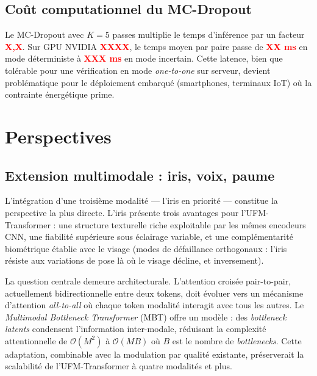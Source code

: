 \documentclass[12pt,a4paper]{report}
\begin{document}
\subsection{Co\^{u}t computationnel du MC-Dropout}

Le MC-Dropout avec $K=5$ passes multiplie le temps d'inf\'{e}rence par un facteur \textcolor{red}{\textbf{X,X}}. Sur GPU NVIDIA \textcolor{red}{\textbf{XXXX}}, le temps moyen par paire passe de \textcolor{red}{\textbf{XX ms}} en mode d\'{e}terministe \`{a} \textcolor{red}{\textbf{XXX ms}} en mode incertain. Cette latence, bien que tol\'{e}rable pour une v\'{e}rification en mode \emph{one-to-one} sur serveur, devient probl\'{e}matique pour le d\'{e}ploiement embarqu\'{e} (smartphones, terminaux IoT) o\`{u} la contrainte \'{e}nerg\'{e}tique prime.

\section{Perspectives}
\label{chap:perspectives}

\subsection{Extension multimodale : iris, voix, paume}

L'int\'{e}gration d'une troisi\`{e}me modalit\'{e} --- l'iris en priorit\'{e} --- constitue la perspective la plus directe. L'iris pr\'{e}sente trois avantages pour l'UFM-Transformer : une structure texturelle riche exploitable par les m\^{e}mes encodeurs CNN, une fiabilit\'{e} sup\'{e}rieure sous \'{e}clairage variable, et une compl\'{e}mentarit\'{e} biom\'{e}trique \'{e}tablie avec le visage (modes de d\'{e}faillance orthogonaux : l'iris r\'{e}siste aux variations de pose l\`{a} o\`{u} le visage d\'{e}cline, et inversement).

La question centrale demeure architecturale. L'attention crois\'{e}e pair-to-pair, actuellement bidirectionnelle entre deux tokens, doit \'{e}voluer vers un m\'{e}canisme d'attention \emph{all-to-all} o\`{u} chaque token modalit\'{e} interagit avec tous les autres. Le \emph{Multimodal Bottleneck Transformer} (MBT) \cite{nagrani2021attention} offre un mod\`{e}le : des \emph{bottleneck latents} condensent l'information inter-modale, r\'{e}duisant la complexit\'{e} attentionnelle de $\mathcal{O}(M^2)$ \`{a} $\mathcal{O}(MB)$ o\`{u} $B$ est le nombre de \emph{bottlenecks}. Cette adaptation, combinable avec la modulation par qualit\'{e} existante, pr\'{e}serverait la scalabilit\'{e} de l'UFM-Transformer \`{a} quatre modalit\'{e}s et plus.
\end{document}
